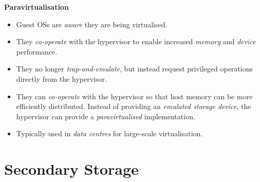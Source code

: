 \documentclass[11pt,a4paper]{article}
\begin{document}
\textbf{Paravirtualisation}
\begin{itemize}
    \item Guest OSs are \emph{aware} they are being virtualised.
    \item They \emph{co-operate} with the hypervisor to enable increased \emph{memory} and
        \emph{device} performance.
    \item They no longer \emph{trap-and-emulate}, but instead request privileged operations
        directly from the hypervisor.
    \item They can \emph{co-operate} with the hypervisor so that host memory can be more
        efficiently distributed.
        Instead of providing an \emph{emulated storage device}, the hypervisor can provide
        a \emph{paravirtualised} implementation.
    \item Typically used in \emph{data centres} for large-scale virtualisation.
\end{itemize}

\break{}

\section{Secondary Storage}
\end{document}
